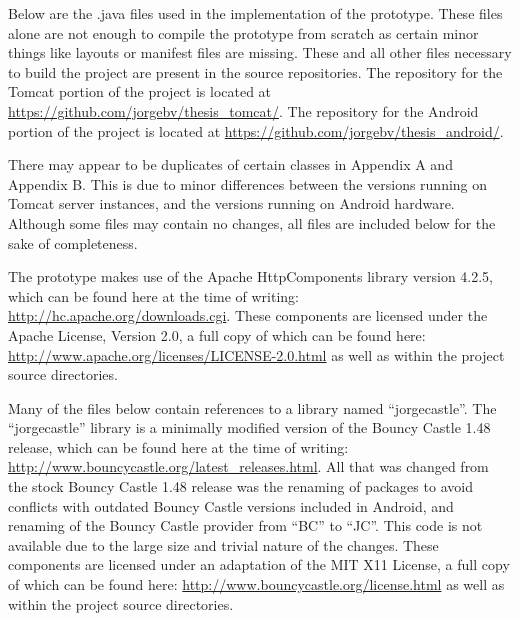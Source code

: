 Below are the .java files used in the implementation of the prototype. These files alone are not enough to compile the prototype from scratch as certain minor things like layouts or manifest files are missing. These and all other files necessary to build the project are present in the source repositories. The repository for the Tomcat portion of the project is located at \url{https://github.com/jorgebv/thesis_tomcat/}. The repository for the Android portion of the project is located at \url{https://github.com/jorgebv/thesis_android/}.

There may appear to be duplicates of certain classes in Appendix A and Appendix B. This is due to minor differences between the versions running on Tomcat server instances, and the versions running on Android hardware. Although some files may contain no changes, all files are included below for the sake of completeness.

The prototype makes use of the Apache HttpComponents library version 4.2.5, which can be found here at the time of writing: \url{http://hc.apache.org/downloads.cgi}. These components are licensed under the Apache License, Version 2.0, a full copy of which can be found here: \url{http://www.apache.org/licenses/LICENSE-2.0.html} as well as within the project source directories.

Many of the files below contain references to a library named ``jorgecastle''. The ``jorgecastle'' library is a minimally modified version of the Bouncy Castle 1.48 release, which can be found here at the time of writing: \url{http://www.bouncycastle.org/latest_releases.html}. All that was changed from the stock Bouncy Castle 1.48 release was the renaming of packages to avoid conflicts with outdated Bouncy Castle versions included in Android, and renaming of the Bouncy Castle provider from ``BC'' to ``JC''. This code is not available due to the large size and trivial nature of the changes. These components are licensed under an adaptation of the MIT X11 License, a full copy of which can be found here: \url{http://www.bouncycastle.org/license.html} as well as within the project source directories.